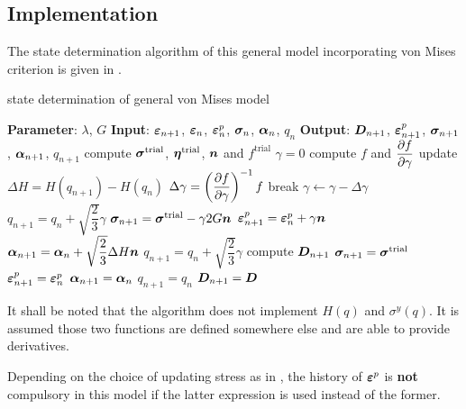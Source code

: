 \subsection{Implementation}
The state determination algorithm of this general model incorporating von Mises criterion is given in .
\begin{breakablealgorithm}
    \caption{state determination of general von Mises model}\label{algo:j2_model}
    \begin{algorithmic}
        \State \textbf{Parameter}: $\lambda$, $G$
        \State \textbf{Input}: $\bm{\varepsilon}_{n+1}$, $\bm{\varepsilon}_n$, $\bm{\varepsilon}^p_n$, $\bm{\sigma}_n$, $\bm{\alpha}_n$, $q_n$
        \State \textbf{Output}: $\bm{D}_{n+1}$, $\bm{\varepsilon}^p_{n+1}$, $\bm{\sigma}_{n+1}$, $\bm{\alpha}_{n+1}$, $q_{n+1}$
        \State compute $\bm{\sigma}^\text{trial}$, $\bm{\eta}^\text{trial}$, $\bm{n}$ and $f^\text{trial}$
        \State $\gamma=0$
        \State compute $f$ and $\dfrac{\partial{f}}{\partial{\gamma}}$
        \State update $\Delta{}H=H\left(q_{n+1}\right)-H\left(q_n\right)$
        \State $\Delta\gamma=\left(\dfrac{\partial{f}}{\partial{\gamma}}\right)^{-1}f$
        \State break
        \EndIf
        \State $\gamma\leftarrow\gamma-\Delta\gamma$
        \State $q_{n+1}=q_n+\sqrt{\dfrac{2}{3}}\gamma$
        \EndWhile
        \State $\bm{\sigma}_{n+1}=\bm{\sigma}^\text{trial}-\gamma2G\bm{n}$
        \State $\bm{\varepsilon}^p_{n+1}=\bm{\varepsilon}^p_n+\gamma\bm{n}$
        \State $\bm{\alpha}_{n+1}=\bm{\alpha}_n+\sqrt{\dfrac{2}{3}}\Delta{}H\bm{n}$
        \State $q_{n+1}=q_n+\sqrt{\dfrac{2}{3}}\gamma$
        \State compute $\bm{D}_{n+1}$
        \Else
        \State $\bm{\sigma}_{n+1}=\bm{\sigma}^\text{trial}$
        \State $\bm{\varepsilon}^p_{n+1}=\bm{\varepsilon}^p_n$
        \State $\bm{\alpha}_{n+1}=\bm{\alpha}_n$
        \State $q_{n+1}=q_n$
        \State $\bm{D}_{n+1}=\bm{D}$
        \EndIf
    \end{algorithmic}
\end{breakablealgorithm}
It shall be noted that the algorithm does not implement $H\left(q\right)$ and $\sigma^y\left(q\right)$. It is assumed those two functions are defined somewhere else and are able to provide derivatives.

Depending on the choice of updating stress as in , the history of $\bm{\varepsilon}^p$ is \textbf{not} compulsory in this model if the latter expression is used instead of the former.

